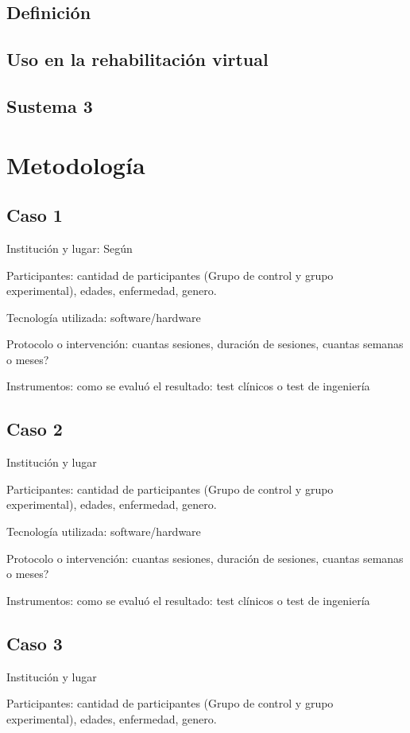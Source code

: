 \documentclass[journal]{IEEEtran}
\begin{document}
\subsection{Definición}
\subsection{Uso en la rehabilitación virtual}
\subsection{Sustema 3}



\section{Metodología}
\subsection{Caso 1}
Institución y lugar: Según \cite{Cedric}

Participantes: cantidad de participantes (Grupo de control y grupo experimental), edades, enfermedad, genero.

Tecnología utilizada: software/hardware 

Protocolo o intervención: cuantas sesiones, duración de sesiones, cuantas semanas o meses?

Instrumentos: como se evaluó el resultado: test clínicos o test de ingeniería 

\subsection{Caso 2}
Institución y lugar

Participantes: cantidad de participantes (Grupo de control y grupo experimental), edades, enfermedad, genero.

Tecnología utilizada: software/hardware 

Protocolo o intervención: cuantas sesiones, duración de sesiones, cuantas semanas o meses?

Instrumentos: como se evaluó el resultado: test clínicos o test de ingeniería 


\subsection{Caso 3}
Institución y lugar

Participantes: cantidad de participantes (Grupo de control y grupo experimental), edades, enfermedad, genero.
\end{document}
